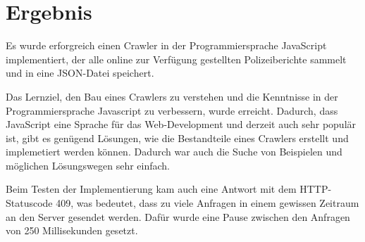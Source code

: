 \section{Ergebnis}\label{header-n6}

Es wurde erforgreich einen Crawler in der Programmiersprache JavaScript implementiert, der alle online zur Verfügung gestellten Polizeiberichte sammelt und in eine JSON-Datei speichert.

Das Lernziel, den Bau eines Crawlers zu verstehen und die Kenntnisse in der Programmiersprache Javascript zu verbessern, wurde erreicht. Dadurch, dass JavaScript eine Sprache für das
Web-Development und derzeit auch sehr populär ist, gibt es genügend Lösungen, wie die Bestandteile eines Crawlers erstellt und implemetiert werden können. Dadurch war auch die Suche von Beispielen und möglichen Lösungswegen sehr einfach.

Beim Testen der Implementierung kam auch eine Antwort mit dem HTTP-Statuscode 409, was bedeutet, dass zu viele Anfragen in einem gewissen Zeitraum an den Server gesendet werden.
Dafür wurde eine Pause zwischen den Anfragen von 250 Millisekunden gesetzt.
